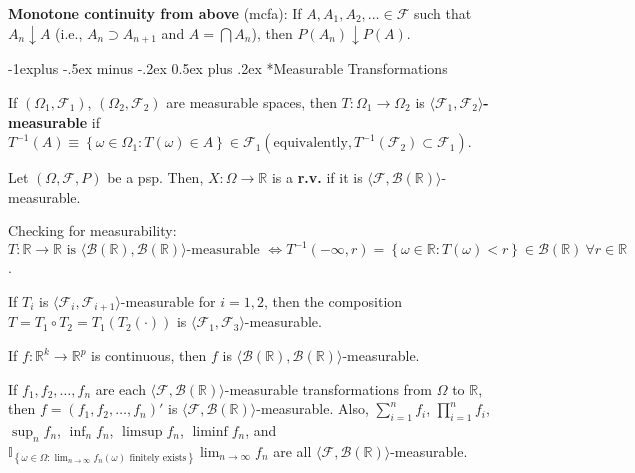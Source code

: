 \documentclass[paper=letter,fontsize=2.89mm]{scrartcl}
\makeatletter
\newcommand{\Borel}{\mathcal{B}}
\newcommand{\R}{\mathbb{R}}
\newcommand\indicate[1]{\mathbb{I}_{ #1 }}
\newcommand\set[1]{\left\{ #1 \right\}}
\renewcommand{\subsection}{\@startsection{subsection}{2}{0mm}%
                                {-1explus -.5ex minus -.2ex}%
                                {0.5ex plus .2ex}%
                                {\normalfont\normalsize\bfseries}}
\makeatother
\begin{document}
\begin{multicols*}{3}
\textbf{Monotone continuity from above} (mcfa): If $A, A_1, A_2, \dots \in \mathcal{F}$ such that $A_n \downarrow A$ (i.e., $A_n \supset A_{n+1}$ and $A = \bigcap A_n$), then $P(A_n) \downarrow P(A)$. \\\medskip

\subsection*{Measurable Transformations}

If $(\Omega_1, \mathcal{F}_1)$, $(\Omega_2, \mathcal{F}_2)$ are measurable spaces, then $T: \Omega_1 \to \Omega_2$ is \textbf{$\langle \mathcal{F}_1, \mathcal{F}_2\rangle$-measurable} if $T^{-1}(A) \equiv \set{\omega \in \Omega_1: T(\omega) \in A} \in \mathcal{F}_1 (\text{equivalently}, T^{-1}(\mathcal{F}_2) \subset \mathcal{F}_1)$. \\ \medskip

Let $(\Omega, \mathcal{F}, P)$ be a psp. Then, $X: \Omega \to \R$ is a \textbf{r.v.\@} if it is $\langle \mathcal{F}, \Borel(\R)\rangle$-measurable. \\\medskip

Checking for measurability: $T: \R \to \R \text{ is } \langle\Borel(\R), \Borel(\R)\rangle\text{-measurable } \iff T^{-1}(-\infty, r) = \set{\omega \in \R: T(\omega) < r} \in \Borel(\R) ~\forall r \in \R$. \\\medskip

If $T_i$ is $\langle \mathcal{F}_i, \mathcal{F}_{i+1}\rangle$-measurable for $i = 1,2$, then the composition $T = T_1 \circ T_2 = T_1(T_2(\cdot))$ is $\langle \mathcal{F}_1, \mathcal{F}_3\rangle$-measurable. \\\medskip

If $f: \R^k \to \R^p$ is continuous, then $f$ is $\langle\Borel(\R), \Borel(\R)\rangle$-measurable. \\\medskip

If $f_1, f_2, \dots, f_n$ are each $\langle \mathcal{F},\Borel(\R) \rangle$-measurable transformations from $\Omega$ to $\R$, then $f = (f_1, f_2, \dots, f_n)'$ is $\langle\mathcal{F},\Borel(\R)\rangle$-measurable. Also, $\sum_{i=1}^n f_i$, $\prod_{i=1}^nf_i$, $\sup_n f_n$, $\inf_n f_n$, $\limsup f_n$, $\liminf f_n$, and $\indicate{\set{\omega\in\Omega:\lim_{n\to\infty}f_n(\omega) \text{ finitely exists}}} \lim_{n\to\infty}f_n$ are all $\langle\mathcal{F}, \Borel(\R)\rangle$-measurable. \\\medskip


\end{multicols*}
\end{document}
